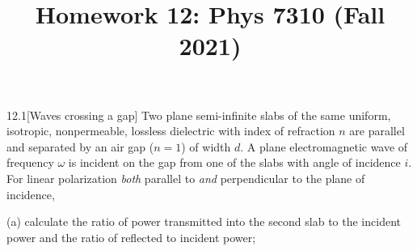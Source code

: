 \documentclass[12pt]{article}
\title{Homework 12: Phys 7310 (Fall 2021)}
\begin{document}
\maketitle
\begin{problem}{12.1}[Waves crossing a gap]
Two plane semi-infinite slabs of the same uniform, isotropic, nonpermeable,
lossless dielectric with index of refraction $n$ are parallel and separated by
an air gap ($n=1$) of width $d$. A plane electromagnetic wave of frequency
$\omega$ is incident on the gap from one of the slabs with angle of incidence
$i$. For linear polarization \textit{both} parallel to \textit{and}
perpendicular to the plane of incidence,

(a) calculate the ratio of power transmitted into the second slab to the
incident power and the ratio of reflected to incident power;


\end{problem}
\end{document}
